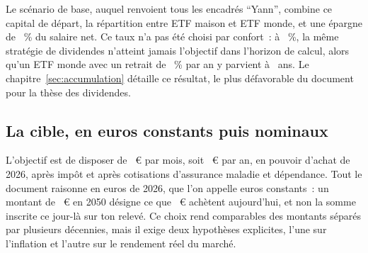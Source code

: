 Le sc\'enario de base, auquel renvoient tous les encadr\'es \enquote{Yann}, combine ce capital de
d\'epart, la r\'epartition \ReferenzStrategie{} entre ETF maison et ETF monde, et une \'epargne de
\ReferenzSparquote~\% du salaire net. Ce taux n'a pas \'et\'e choisi par confort~: \`a
\SparquoteZwanzig~\%, la m\^eme strat\'egie de dividendes n'atteint jamais l'objectif dans l'horizon de
calcul, alors qu'un ETF monde avec un retrait de \TauxRetrait~\% par an y parvient \`a
\AlterEtfReferenzZwanzig~ans. Le chapitre~\ref{sec:accumulation} d\'etaille ce r\'esultat, le plus d\'efavorable du
document pour la th\`ese des dividendes.

\subsection{La cible, en euros constants puis nominaux}\label{sec:depart-cible}

L'objectif est de disposer de \ZielMonat~€ par mois, soit \ZielJahr~€ par an, en pouvoir d'achat de
2026, apr\`es imp\^ot et apr\`es cotisations d'assurance maladie et d\'ependance. Tout le document
raisonne en euros de 2026, que l'on appelle euros constants~: un montant de \ZielMonat~€ en 2050
d\'esigne ce que \ZielMonat~€ ach\`etent aujourd'hui, et non la somme inscrite ce jour-l\`a sur ton
relev\'e. Ce choix rend comparables des montants s\'epar\'es par plusieurs d\'ecennies, mais il exige
deux hypoth\`eses explicites, l'une sur l'inflation et l'autre sur le rendement r\'eel du march\'e.



